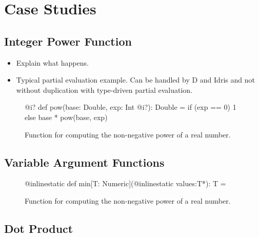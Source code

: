 \section{Case Studies}
\label{sct:case-studies}

\subsection{Integer Power Function}
\begin{itemize}
  \item Explain what happens.
  \item Typical partial evaluation example. Can be handled by D and Idris and not without duplication with type-driven partial evaluation.
\end{itemize}

\begin{figure}
\begin{listing}
@i? def pow(base: Double, exp: Int @i?): Double =
  if (exp == 0) 1 else base * pow(base, exp)
\end{listing}
\caption{\label{lst:vector_deep_ir} Function for computing the non-negative power of a real number.}
\end{figure}

\subsection{Variable Argument Functions}

\begin{figure}
\begin{listing}
@inlinestatic def min[T: Numeric](@inlinestatic values:T*): T =
\end{listing}
\caption{\label{lst:vector_deep_ir} Function for computing the non-negative power of a real number.}
\end{figure}

\subsection{Dot Product}

